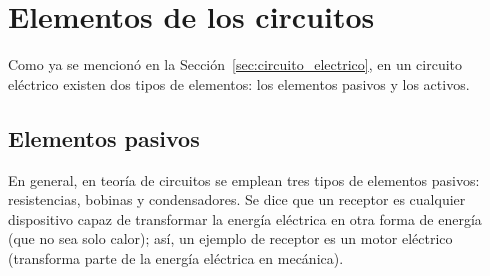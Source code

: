 	\section{Elementos de los circuitos}
	Como ya se mencionó en la
        Sección~\ref{sec:circuito_electrico}, en un circuito eléctrico
        existen dos tipos de elementos: los elementos pasivos y los
        activos.
	
	\subsection{Elementos pasivos}
	
	En general, en teoría de circuitos se emplean tres tipos de
        elementos pasivos: resistencias, bobinas y condensadores. Se
        dice que un receptor es cualquier dispositivo capaz de
        transformar la energía eléctrica en otra forma de energía (que
        no sea solo calor); así, un ejemplo de receptor es un motor
        eléctrico (transforma parte de la energía eléctrica en
        mecánica).
	
